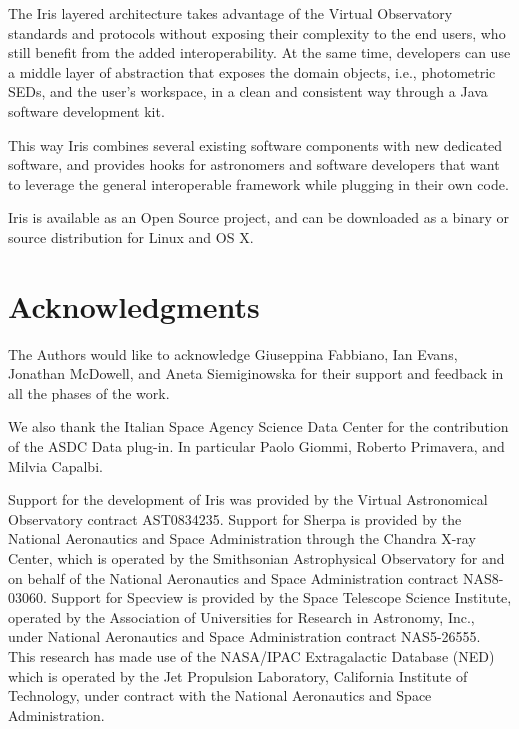 \documentclass[preprint,authoryear,5p]{elsarticle}
\begin{document}
The Iris layered architecture takes advantage of the Virtual Observatory
standards and protocols without exposing their complexity to the end users,
who still benefit from the added interoperability. At the same time, developers
can use a middle layer of abstraction that exposes the domain objects, i.e.,
photometric SEDs, and the user's workspace, in a clean and consistent
way through a Java software development kit.

\begin{sloppypar}
This way Iris combines several existing software components with new dedicated
software, and provides hooks for astronomers and software developers that want to
leverage the general interoperable framework while plugging in their own code.
\end{sloppypar}

Iris is available as an Open Source project, and can be downloaded as a binary
or source distribution for Linux and OS X.


\section*{Acknowledgments}
The Authors would like to acknowledge Giuseppina Fabbiano, Ian Evans,
Jonathan McDowell, and Aneta Siemiginowska
for their support and feedback in all the phases of the work.

We also thank the Italian Space Agency Science Data Center for the contribution
of the ASDC Data plug-in. In particular Paolo Giommi, Roberto Primavera, and
Milvia Capalbi.

Support for the development of Iris was provided by
the Virtual Astronomical Observatory contract AST0834235. Support for Sherpa is
provided by the National Aeronautics and Space Administration through the
Chandra X-ray Center, which is operated by the Smithsonian Astrophysical
Observatory for and on behalf of the National Aeronautics and Space
Administration contract NAS8-03060.  Support for Specview is provided by the
Space Telescope Science Institute, operated by the Association of Universities
for Research in Astronomy, Inc., under National Aeronautics and Space
Administration contract NAS5-26555. This research has made use of the NASA/IPAC
Extragalactic Database (NED) which is operated by the Jet Propulsion Laboratory,
California Institute of Technology, under contract with the National Aeronautics
and Space Administration.


\end{document}
